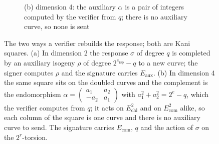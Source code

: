 \documentclass[version=preprint]{iacrcc}
\newcommand{\Ecom}{E_{\mathrm{com}}}
\newcommand{\Echl}{E_{\mathrm{chl}}}
\newcommand{\Eaux}{E_{\mathrm{aux}}}
\begin{document}
\begin{figure}[t]
\begin{subfigure}[b]{0.54\textwidth}
            \caption*{\small (b) dimension 4: the auxiliary $\alpha$ is a pair of
                integers computed by the verifier from $q$; there is no auxiliary curve,
                so none is sent}
        \end{subfigure}
        \caption{The two ways a verifier rebuilds the response; both are Kani
            squares. (a) In dimension 2 the response $\sigma$ of degree $q$ is
            completed by an auxiliary isogeny $\rho$ of degree
            $2^{e_{\mathrm{rsp}}} - q$ to a new curve; the signer computes $\rho$ and the signature carries $\Eaux$. (b) In
            dimension 4 the same square sits on the doubled curves and the complement
            is the endomorphism
            $\alpha = \left(\begin{smallmatrix} a_1 & a_2 \\ -a_2 & a_1 \end{smallmatrix}\right)$
            with $a_1^2 + a_2^2 = 2^e - q$, which the verifier computes from $q$; it
            acts on $\Echl^2$ and on $\Ecom^2$ alike, so each column of the square is
            one curve and there is no auxiliary curve to send. The signature carries
            $\Ecom$, $q$ and the action of $\sigma$ on the $2^r$-torsion.}
        \label{fig:kani}
    \end{figure}
\end{document}
